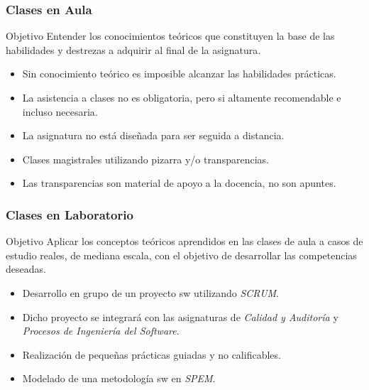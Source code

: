 \documentclass[animated,a4paper,slidestop,xcolor=pst,blue]{beamer}
\begin{document}
\begin{frame}
	\frametitle{Clases en Aula}
	\begin{block}{Objetivo}
        Entender los conocimientos teóricos que constituyen la base de las habilidades y destrezas a adquirir al final de la asignatura.
	\end{block}
	\begin{itemize}
		\item<2-> \alert{Sin conocimiento teórico es imposible alcanzar las habilidades prácticas}.
        \item<3-> La asistencia a clases no es obligatoria, \alert{pero si altamente recomendable e incluso necesaria}.
        \item<4-> La asignatura no está diseñada para ser seguida a distancia.		
        \item<5-> Clases magistrales utilizando pizarra y/o transparencias.
		\item<6-> \alert{Las transparencias} son material de apoyo a la docencia, \alert{no son apuntes}.
	\end{itemize}
\end{frame}

\begin{frame}[c]
	\frametitle{Clases en Laboratorio}
	\begin{block}{Objetivo}
        Aplicar los conceptos teóricos aprendidos en las clases de aula a casos de estudio reales, de mediana escala, con el objetivo de desarrollar las competencias deseadas.
	\end{block}
	\begin{itemize}[<+->]
        \item Desarrollo \alert{en grupo} de un proyecto sw utilizando \emph{SCRUM}.
        \item Dicho proyecto se integrará con las asignaturas de \emph{Calidad y Auditoría} y \emph{Procesos de Ingeniería del Software}.
        \item Realización de pequeñas prácticas guiadas y no calificables.
        \item Modelado de una metodología sw en \emph{SPEM}.
	\end{itemize}
\end{frame}
\end{document}
